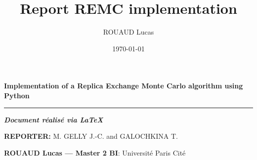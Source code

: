 \documentclass[12pt, oneside, a4paper]{report}
\title{Report REMC implementation}
\author{ROUAUD Lucas}
\date{\today}
\begin{document}
\begin{huge}
    \begin{flushleft}
        \bfseries Implementation of a Replica Exchange\linebreak
        Monte Carlo algorithm using Python
    
        \vspace{1ex}
        
        \hrule height 2pt
    \end{flushleft}
\end{huge}

\vspace{1ex}

\textit{\textbf{\large Document réalisé via \LaTeX{}}}

\textbf{REPORTER:} M. GELLY J.-C. and GALOCHKINA T.

\textbf{ROUAUD Lucas --- Master 2 BI}: Université Paris Cité

\vspace{2ex}
\end{document}

